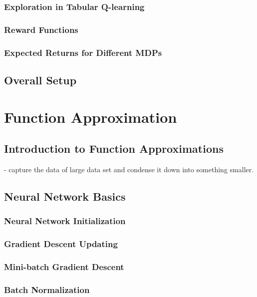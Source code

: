 \subsubsection{Exploration in Tabular Q-learning}
\subsubsection{Reward Functions}
\subsubsection{Expected Returns for Different MDPs}

\subsection{Overall Setup}



\section{Function Approximation}
\subsection{Introduction to Function Approximations}
- capture the data of large data set and condense it down into something smaller.
\subsection{Neural Network Basics}
\subsubsection{Neural Network Initialization}
\subsubsection{Gradient Descent Updating}
\subsubsection{Mini-batch Gradient Descent}
\subsubsection{Batch Normalization}
